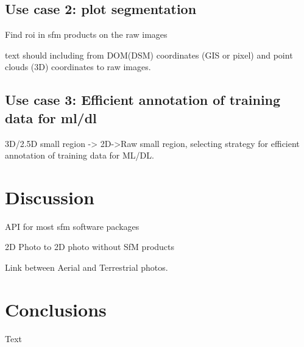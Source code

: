 \documentclass[sensors,article,submit,moreauthors, xelatex]{Definitions/mdpi}
\begin{document}
\subsection{Use case 2: plot segmentation}

Find \acrshort*{roi} in \acrshort*{sfm} products on the raw images

text \cite{ma_calculation_2019, guo_illumination_2013}
should including from DOM(DSM) coordinates (GIS or pixel) and point clouds (3D) coordinates to raw images.

\subsection{Use case 3: Efficient annotation of training data for \acrshort*{ml}/\acrshort*{dl}}
3D/2.5D small region -> 2D->Raw small region, selecting strategy for efficient annotation of training data for ML/DL.

\section{Discussion}

API for most \acrshort*{sfm} software packages

2D Photo to 2D photo without SfM products

Link between Aerial and Terrestrial photos.

\section{Conclusions}
Text

\vspace{6pt} 
\end{document}

